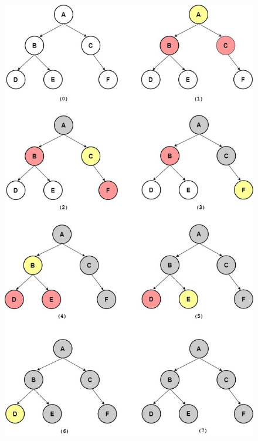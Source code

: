 \begin{figure}[H]
    \centering
    \includegraphics[scale=0.5]{pic/DFS1.jpg}
    \label{fig:my_label}
\end{figure}

